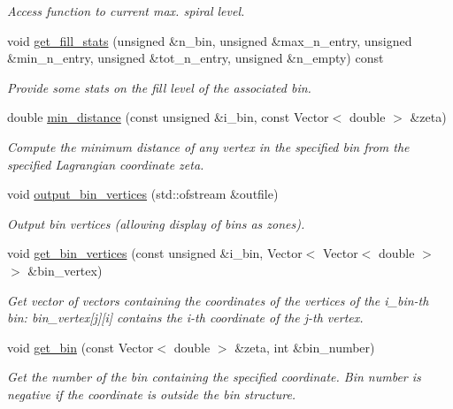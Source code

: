 \begin{DoxyCompactItemize}
\begin{DoxyCompactList}\small\item\em Access function to current max. spiral level. \end{DoxyCompactList}\item 
void \hyperlink{classNonRefineableBinArray_acaf7074a42df5d890372cc6d53c90694}{get\+\_\+fill\+\_\+stats} (unsigned \&n\+\_\+bin, unsigned \&max\+\_\+n\+\_\+entry, unsigned \&min\+\_\+n\+\_\+entry, unsigned \&tot\+\_\+n\+\_\+entry, unsigned \&n\+\_\+empty) const
\begin{DoxyCompactList}\small\item\em Provide some stats on the fill level of the associated bin. \end{DoxyCompactList}\item 
double \hyperlink{classNonRefineableBinArray_aeec23360643e8a4581d8d841a97f2f2b}{min\+\_\+distance} (const unsigned \&i\+\_\+bin, const Vector$<$ double $>$ \&zeta)
\begin{DoxyCompactList}\small\item\em Compute the minimum distance of any vertex in the specified bin from the specified Lagrangian coordinate zeta. \end{DoxyCompactList}\item 
void \hyperlink{classNonRefineableBinArray_a9db5392fc81650a23251f1f5de52f0af}{output\+\_\+bin\+\_\+vertices} (std\+::ofstream \&outfile)
\begin{DoxyCompactList}\small\item\em Output bin vertices (allowing display of bins as zones). \end{DoxyCompactList}\item 
void \hyperlink{classNonRefineableBinArray_a84750d2bf80a132783b3982ad1462ffc}{get\+\_\+bin\+\_\+vertices} (const unsigned \&i\+\_\+bin, Vector$<$ Vector$<$ double $>$ $>$ \&bin\+\_\+vertex)
\begin{DoxyCompactList}\small\item\em Get vector of vectors containing the coordinates of the vertices of the i\+\_\+bin-\/th bin\+: bin\+\_\+vertex\mbox{[}j\mbox{]}\mbox{[}i\mbox{]} contains the i-\/th coordinate of the j-\/th vertex. \end{DoxyCompactList}\item 
void \hyperlink{classNonRefineableBinArray_a02617f0c049a443f5d13ab6d09b6e156}{get\+\_\+bin} (const Vector$<$ double $>$ \&zeta, int \&bin\+\_\+number)
\begin{DoxyCompactList}\small\item\em Get the number of the bin containing the specified coordinate. Bin number is negative if the coordinate is outside the bin structure. \end{DoxyCompactList}\item 

\end{DoxyCompactItemize}
